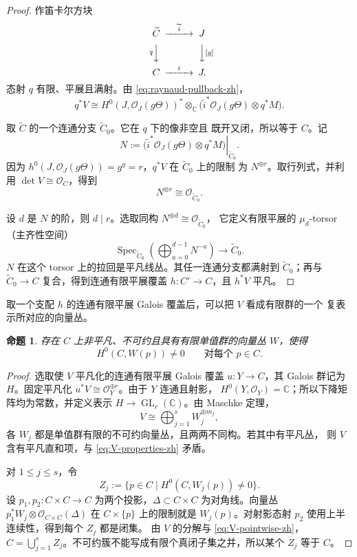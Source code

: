\documentclass[UTF8,10pt,a4paper]{ctexart}
\newtheorem{proposition}[theorem]{命题}
\theoremstyle{remark}
\newcommand{\CC}{\mathbb{C}}
\newcommand{\OO}{\mathcal{O}}
\newcommand{\tens}{\otimes}
\DeclareMathOperator{\Spec}{Spec}
\begin{document}
\begin{proof}
作笛卡尔方块
\[
\begin{CD}
  \widetilde C @>{\widetilde i}>> J\\
  @V{q}VV                         @VV{[g]}V\\
  C              @>{i}>>          J.
\end{CD}
\]
态射 $q$ 有限、平展且满射。由 \eqref{eq:raynaud-pullback-zh}，
\[
  q^*V
  \cong
  H^0\!\left(J,\OO_J(g\Theta)\right)^*
  \tens_{\CC}
  \bigl(\widetilde i^*\OO_J(g\Theta)\tens q^*M\bigr).
\]

取 $\widetilde C$ 的一个连通分支 $\widetilde C_0$。它在 $q$ 下的像非空且
既开又闭，所以等于 $C$。记
\[
  N:=\left.
  \bigl(\widetilde i^*\OO_J(g\Theta)\tens q^*M\bigr)
  \right|_{\widetilde C_0}.
\]
因为 $h^0(J,\OO_J(g\Theta))=g^g=r$，$q^*V$ 在 $\widetilde C_0$ 上的限制
为 $N^{\oplus r}$。取行列式，并利用 $\det V\cong\OO_C$，得到
\[
  N^{\tens r}\cong\OO_{\widetilde C_0}.
\]

设 $d$ 是 $N$ 的阶，则 $d\mid r$。选取同构
$N^{\tens d}\cong\OO_{\widetilde C_0}$，
它定义有限平展的 $\mu_d$-torsor（主齐性空间）
\[
  \Spec_{\widetilde C_0}
  \left(\bigoplus_{a=0}^{d-1}N^{-a}\right)
  \longrightarrow\widetilde C_0.
\]
$N$ 在这个 torsor 上的拉回是平凡线丛。其任一连通分支都满射到
$\widetilde C_0$；再与 $\widetilde C_0\to C$ 复合，得到连通有限平展覆盖
$h\colon C'\to C$，且 $h^*V$ 平凡。
\end{proof}

取一个支配 $h$ 的连通有限平展 Galois 覆盖后，可以把 $V$ 看成有限群的一个
复表示所对应的向量丛。

\begin{proposition}\label{prop:irreducible-summand-zh}
存在 $C$ 上非平凡、不可约且具有有限单值群的向量丛 $W$，使得
\[
  H^0(C,W(p))\neq0
  \qquad\text{对每个 }p\in C.
\]
\end{proposition}

\begin{proof}
选取使 $V$ 平凡化的连通有限平展 Galois 覆盖 $u\colon Y\to C$，其 Galois
群记为 $H$。固定平凡化 $u^*V\cong\OO_Y^{\oplus r}$。由于 $Y$ 连通且射影，
$H^0(Y,\OO_Y)=\CC$；所以下降矩阵均为常数，并定义表示
$H\to\operatorname{GL}_r(\CC)$。由 Maschke 定理，
\[
  V\cong\bigoplus_{j=1}^{s}W_j^{\oplus m_j},
\]
各 $W_j$ 都是单值群有限的不可约向量丛，且两两不同构。若其中有平凡丛，
则 $V$ 含有平凡直和项，与 \eqref{eq:V-properties-zh} 矛盾。

对 $1\leq j\leq s$，令
\[
  Z_j:=\{p\in C\mid H^0(C,W_j(p))\neq0\}.
\]
设 $p_1,p_2\colon C\times C\to C$ 为两个投影，$\Delta\subset C\times C$
为对角线。向量丛
$p_1^*W_j\tens\OO_{C\times C}(\Delta)$ 在 $C\times\{p\}$ 上的限制就是
$W_j(p)$。对射影态射 $p_2$ 使用上半连续性，得到每个 $Z_j$ 都是闭集。
由 $V$ 的分解与 \eqref{eq:V-pointwise-zh}，
$C=\bigcup_{j=1}^{s}Z_j$。不可约簇不能写成有限个真闭子集之并，所以某个
$Z_j$ 等于 $C$。
\end{proof}
\end{document}
